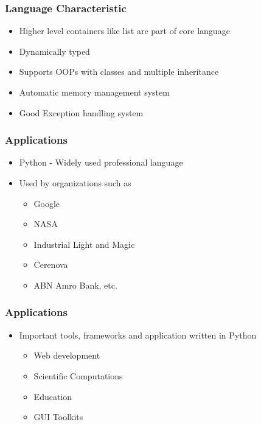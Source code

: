 \documentclass[14pt]{beamer}
\begin{document}
    \begin{frame}
        \frametitle{Language Characteristic}
        \begin{itemize}
            \item Higher level containers like list are part of core language
            \item Dynamically typed
            \item Supports OOPs with classes and multiple inheritance
            \item Automatic memory management system
            \item Good Exception handling system
        \end{itemize}
    \end{frame}
    \begin{frame}
        \frametitle{Applications}
        \begin{itemize}
            \item Python - Widely used professional language
            \item Used by organizations such as
                \begin{itemize}
                    \item Google
                    \item NASA
                    \item Industrial Light and Magic
                    \item Cerenova
                    \item ABN Amro Bank, etc.
                \end{itemize}
        \end{itemize}
    \end{frame}
    \begin{frame}
        \frametitle{Applications}
        \begin{itemize}
            \item Important tools, frameworks and application written in Python
            \begin{itemize}
                \item Web development
                \item Scientific Computations
                \item Education
                \item GUI Toolkits
            \end{itemize}

        \end{itemize}
    \end{frame}
\end{document}
